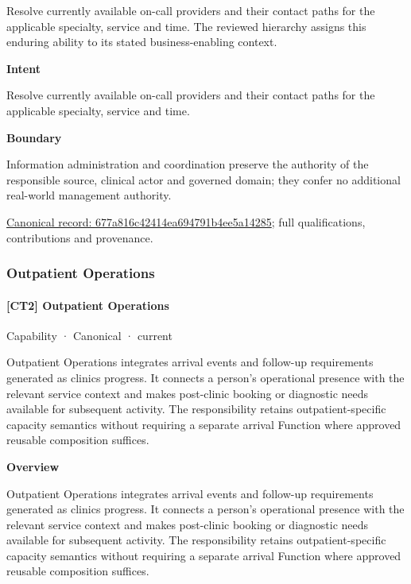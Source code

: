 Resolve currently available on-call providers and their contact paths for the applicable specialty, service and time. The reviewed hierarchy assigns this enduring ability to its stated business-enabling context.



\textbf{Intent}



Resolve currently available on-call providers and their contact paths for the applicable specialty, service and time.



\textbf{Boundary}



Information administration and coordination preserve the authority of the responsible source, clinical actor and governed domain; they confer no additional real-world management authority.


{\footnotesize \href{../../../../continuum/strategy/capability/677a816c42414ea694791b4ee5a14285.md}{Canonical record: 677a816c42414ea694791b4ee5a14285}; full qualifications, contributions and provenance.}\par
\subsubsection{Outpatient Operations}

\paragraph{[CT2] Outpatient Operations}

\label{element:21399d52b9624ddfbeb786f1d72e40c3}
{\small Capability · Canonical · current}\par

Outpatient Operations integrates arrival events and follow-up requirements generated as clinics progress. It connects a person's operational presence with the relevant service context and makes post-clinic booking or diagnostic needs available for subsequent activity. The responsibility retains outpatient-specific capacity semantics without requiring a separate arrival Function where approved reusable composition suffices.



\textbf{Overview}



Outpatient Operations integrates arrival events and follow-up requirements generated as clinics progress. It connects a person's operational presence with the relevant service context and makes post-clinic booking or diagnostic needs available for subsequent activity. The responsibility retains outpatient-specific capacity semantics without requiring a separate arrival Function where approved reusable composition suffices.



